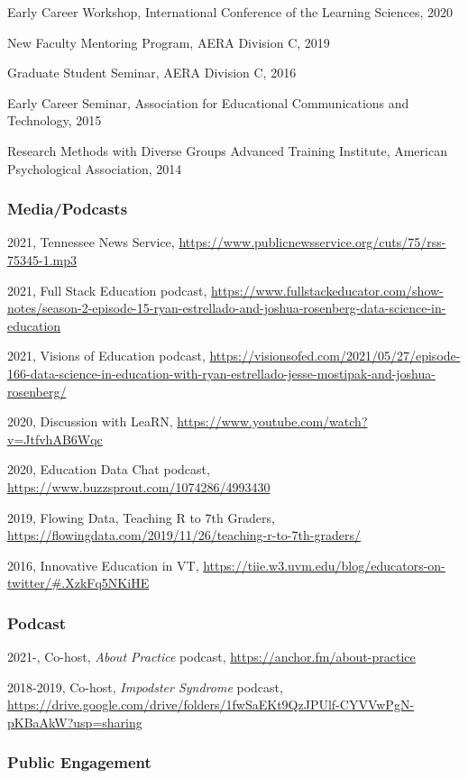 \documentclass[
  14,
]{article}
\begin{document}
Early Career Workshop, International Conference of the Learning
Sciences, 2020

New Faculty Mentoring Program, AERA Division C, 2019

Graduate Student Seminar, AERA Division C, 2016

Early Career Seminar, Association for Educational Communications and
Technology, 2015

Research Methods with Diverse Groups Advanced Training Institute,
American Psychological Association, 2014

\hypertarget{mediapodcasts}{%
\subsubsection{Media/Podcasts}\label{mediapodcasts}}

2021, Tennessee News Service,
\url{https://www.publicnewsservice.org/cuts/75/rss-75345-1.mp3}

2021, Full Stack Education podcast,
\url{https://www.fullstackeducator.com/show-notes/season-2-episode-15-ryan-estrellado-and-joshua-rosenberg-data-science-in-education}

2021, Visions of Education podcast,
\url{https://visionsofed.com/2021/05/27/episode-166-data-science-in-education-with-ryan-estrellado-jesse-mostipak-and-joshua-rosenberg/}

2020, Discussion with LeaRN,
\url{https://www.youtube.com/watch?v=JtfvhAB6Wqc}

2020, Education Data Chat podcast,
\url{https://www.buzzsprout.com/1074286/4993430}

2019, Flowing Data, Teaching R to 7th Graders,
\url{https://flowingdata.com/2019/11/26/teaching-r-to-7th-graders/}

2016, Innovative Education in VT,
\url{https://tiie.w3.uvm.edu/blog/educators-on-twitter/\#.XzkFq5NKiHE}

\hypertarget{podcast}{%
\subsubsection{Podcast}\label{podcast}}

2021-, Co-host, \emph{About Practice} podcast,
\url{https://anchor.fm/about-practice}

2018-2019, Co-host, \emph{Impodster Syndrome} podcast,
\url{https://drive.google.com/drive/folders/1fwSaEKt9QzJPUlf-CYVVwPgN-pKBaAkW?usp=sharing}

\hypertarget{public-engagement}{%
\subsubsection{Public Engagement}\label{public-engagement}}
\end{document}
